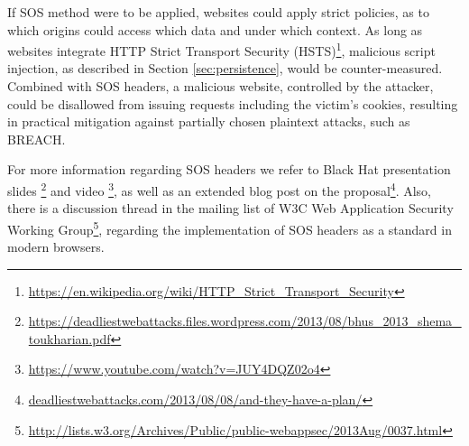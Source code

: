 If SOS method were to be applied, websites could apply strict policies, as to
which origins could access which data and under which context. As long as
websites integrate HTTP Strict Transport Security
(HSTS)\footnote{\url{https://en.wikipedia.org/wiki/HTTP_Strict_Transport_Security}},
malicious script injection, as described in Section \ref{sec:persistence}, would
be counter-measured. Combined with SOS headers, a malicious website, controlled
by the attacker, could be disallowed from issuing requests including the
victim's cookies, resulting in practical mitigation against partially chosen
plaintext attacks, such as BREACH.

For more information regarding SOS headers we refer to Black Hat presentation
slides
\footnote{\url{https://deadliestwebattacks.files.wordpress.com/2013/08/bhus_2013_shema_toukharian.pdf}}
and video \footnote{\url{https://www.youtube.com/watch?v=JUY4DQZ02o4}}, as well
as an extended blog post on the
proposal\footnote{\url{deadliestwebattacks.com/2013/08/08/and-they-have-a-plan/}}.
Also, there is a discussion thread in the mailing list of W3C Web Application
Security Working
Group\footnote{\url{http://lists.w3.org/Archives/Public/public-webappsec/2013Aug/0037.html}},
regarding the implementation of SOS headers as a standard in modern browsers.
